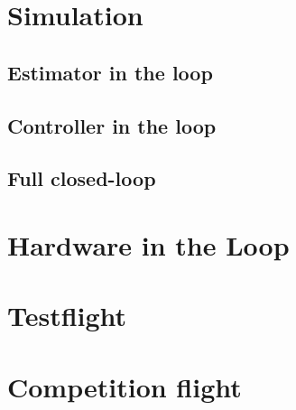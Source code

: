 \section{Simulation}

\subsection{Estimator in the loop}

\subsection{Controller in the loop}

\subsection{Full closed-loop}

\section{Hardware in the Loop}

\section{Testflight}

\section{Competition flight}
